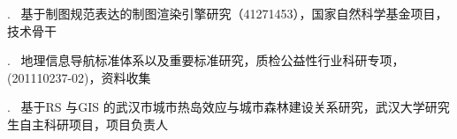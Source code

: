 \vspace{-1.3cm}

. \ 基于制图规范表达的制图渲染引擎研究（41271453），国家自然科学基金项目，技术骨干

. \ 地理信息导航标准体系以及重要标准研究，质检公益性行业科研专项，(201110237-02)，资料收集

. \ 基于RS 与GIS 的武汉市城市热岛效应与城市森林建设关系研究，武汉大学研究生自主科研项目，项目负责人
